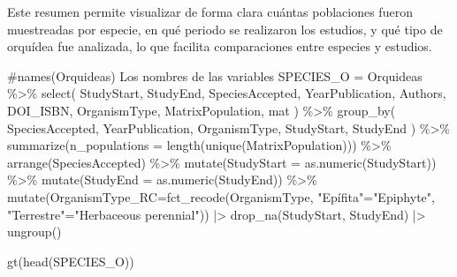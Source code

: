 \documentclass[
  12pt,
  letterpaper,
]{book}
\newenvironment{Shaded}{\begin{snugshade}}{\end{snugshade}}
\newcommand{\AttributeTok}[1]{\textcolor[rgb]{0.40,0.45,0.13}{#1}}
\newcommand{\CommentTok}[1]{\textcolor[rgb]{0.37,0.37,0.37}{#1}}
\newcommand{\FunctionTok}[1]{\textcolor[rgb]{0.28,0.35,0.67}{#1}}
\newcommand{\NormalTok}[1]{\textcolor[rgb]{0.00,0.23,0.31}{#1}}
\newcommand{\OtherTok}[1]{\textcolor[rgb]{0.00,0.23,0.31}{#1}}
\newcommand{\SpecialCharTok}[1]{\textcolor[rgb]{0.37,0.37,0.37}{#1}}
\newcommand{\StringTok}[1]{\textcolor[rgb]{0.13,0.47,0.30}{#1}}
\begin{document}
Este resumen permite visualizar de forma clara cuántas poblaciones
fueron muestreadas por especie, en qué periodo se realizaron los
estudios, y qué tipo de orquídea fue analizada, lo que facilita
comparaciones entre especies y estudios.

\begin{Shaded}
\begin{Highlighting}[]
\CommentTok{\#names(Orquideas) Los nombres de las variables}
\NormalTok{SPECIES\_O }\OtherTok{=}\NormalTok{ Orquideas }\SpecialCharTok{\%\textgreater{}\%}
  \FunctionTok{select}\NormalTok{(}
\NormalTok{    StudyStart,}
\NormalTok{    StudyEnd,}
\NormalTok{    SpeciesAccepted,}
\NormalTok{    YearPublication,}
\NormalTok{    Authors,}
\NormalTok{    DOI\_ISBN,}
\NormalTok{    OrganismType,}
\NormalTok{    MatrixPopulation,}
\NormalTok{    mat}
\NormalTok{  ) }\SpecialCharTok{\%\textgreater{}\%}
  \FunctionTok{group\_by}\NormalTok{(}
\NormalTok{    SpeciesAccepted,}
\NormalTok{    YearPublication,}
\NormalTok{    OrganismType,}
\NormalTok{    StudyStart,}
\NormalTok{    StudyEnd}
\NormalTok{  ) }\SpecialCharTok{\%\textgreater{}\%}
  \FunctionTok{summarize}\NormalTok{(}\AttributeTok{n\_populations =} \FunctionTok{length}\NormalTok{(}\FunctionTok{unique}\NormalTok{(MatrixPopulation))) }\SpecialCharTok{\%\textgreater{}\%}
  \FunctionTok{arrange}\NormalTok{(SpeciesAccepted) }\SpecialCharTok{\%\textgreater{}\%}
  \FunctionTok{mutate}\NormalTok{(}\AttributeTok{StudyStart =} \FunctionTok{as.numeric}\NormalTok{(StudyStart)) }\SpecialCharTok{\%\textgreater{}\%}
  \FunctionTok{mutate}\NormalTok{(}\AttributeTok{StudyEnd =} \FunctionTok{as.numeric}\NormalTok{(StudyEnd)) }\SpecialCharTok{\%\textgreater{}\%}
  \FunctionTok{mutate}\NormalTok{(}\AttributeTok{OrganismType\_RC=}\FunctionTok{fct\_recode}\NormalTok{(OrganismType,}
                             \StringTok{"Epífita"}\OtherTok{=}\StringTok{"Epiphyte"}\NormalTok{,}
                             \StringTok{"Terrestre"}\OtherTok{=}\StringTok{"Herbaceous perennial"}\NormalTok{)) }\SpecialCharTok{|\textgreater{}} 
  \FunctionTok{drop\_na}\NormalTok{(StudyStart, StudyEnd) }\SpecialCharTok{|\textgreater{}} 
  \FunctionTok{ungroup}\NormalTok{()}
  

\FunctionTok{gt}\NormalTok{(}\FunctionTok{head}\NormalTok{(SPECIES\_O))}
\end{Highlighting}
\end{Shaded}
\end{document}
